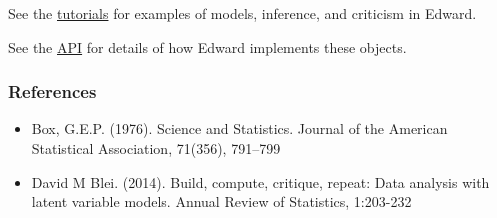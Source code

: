 See the \href{tutorials.html}{tutorials} for examples of models,
inference, and criticism in Edward.

See the \href{api/index.html}{API} for details of how Edward implements these
objects.

\subsubsection{References}\label{references}

\begin{itemize}
\item
  Box, G.E.P. (1976). Science and Statistics. Journal of the American
  Statistical Association, 71(356), 791–799
\item
  David M Blei. (2014). Build, compute, critique, repeat: Data analysis with
  latent variable models. Annual Review of Statistics, 1:203-232
\end{itemize}
